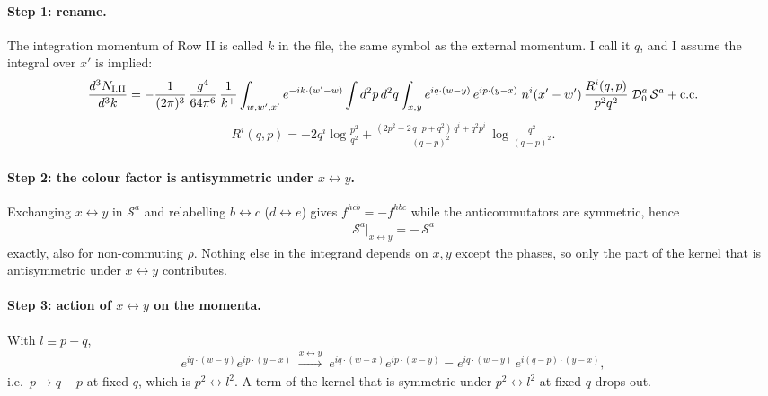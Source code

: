 \documentclass[10pt]{article}
\numberwithin{equation}{section}
\begin{document}
\paragraph{Step 1: rename.} The integration momentum of Row II is called $k$ in the file, the same symbol as the external momentum. I call it $q$, and I assume the integral over $x'$ is implied:
\begin{align}
\frac{d^{3}N_{\rm I.II}}{d^{3}k}=-\frac{1}{(2\pi)^{3}}\,\frac{g^{4}}{64\pi^{6}}\,\frac{1}{k^{+}}\int_{w,w',x'}e^{-ik\cdot(w'-w)}\int d^{2}p\,d^{2}q\int_{x,y}e^{iq\cdot(w-y)}\,e^{ip\cdot(y-x)}\;n^{i}(x'-w')\,\frac{R^{i}(q,p)}{p^{2}q^{2}}\;\mathcal{D}_{0}^{a}\,\mathcal{S}^{a}+{\rm c.c.}
\end{align}
\begin{align}
R^{i}(q,p)=-2q^{i}\log\frac{p^{2}}{q^{2}}+\frac{(2p^{2}-2\,q\cdot p+q^{2})\,q^{i}+q^{2}p^{i}}{(q-p)^{2}}\,\log\frac{q^{2}}{(q-p)^{2}} .
\end{align}

\paragraph{Step 2: the colour factor is antisymmetric under $x\leftrightarrow y$.} Exchanging $x\leftrightarrow y$ in $\mathcal{S}^{a}$ and relabelling $b\leftrightarrow c$ ($d\leftrightarrow e$) gives $f^{hcb}=-f^{hbc}$ while the anticommutators are symmetric, hence
\begin{align}
\mathcal{S}^{a}\big|_{x\leftrightarrow y}=-\,\mathcal{S}^{a}
\end{align}
exactly, also for non-commuting $\rho$. Nothing else in the integrand depends on $x,y$ except the phases, so only the part of the kernel that is antisymmetric under $x\leftrightarrow y$ contributes.

\paragraph{Step 3: action of $x\leftrightarrow y$ on the momenta.} With $l\equiv p-q$,
\begin{align}
e^{iq\cdot(w-y)}e^{ip\cdot(y-x)}\;\xrightarrow{x\leftrightarrow y}\;e^{iq\cdot(w-x)}e^{ip\cdot(x-y)}=e^{iq\cdot(w-y)}\,e^{i(q-p)\cdot(y-x)},
\end{align}
i.e.\ $p\to q-p$ at fixed $q$, which is $p^{2}\leftrightarrow l^{2}$. A term of the kernel that is symmetric under $p^{2}\leftrightarrow l^{2}$ at fixed $q$ drops out.
\end{document}
